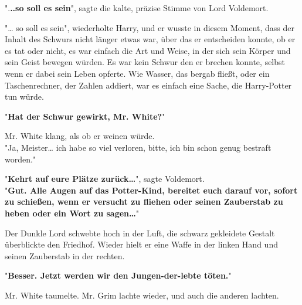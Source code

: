 {".\textbf{..so soll es sein}", sagte die kalte, präzise Stimme von Lord Voldemort.

"… so soll es sein", wiederholte Harry, und er wusste in diesem Moment, dass der Inhalt des Schwurs nicht länger etwas war, über das er entscheiden konnte, ob er es tat oder nicht, es war einfach die Art und Weise, in der sich sein Körper und sein Geist bewegen würden. Es war kein Schwur den er brechen konnte, selbst wenn er dabei sein Leben opferte. Wie Wasser, das bergab fließt, oder ein Taschenrechner, der Zahlen addiert, war es einfach eine Sache, die Harry-Potter tun würde.

"\textbf{Hat der Schwur gewirkt, Mr. White?}"

Mr. White klang, als ob er weinen würde.\\ "Ja, Meister… ich habe so viel verloren, bitte, ich bin schon genug bestraft worden."

"\textbf{Kehrt auf eure Plätze zurück…}", sagte Voldemort.\\ "\textbf{Gut. Alle Augen auf das Potter-Kind, bereitet euch darauf vor, sofort zu schießen, wenn er versucht zu fliehen oder seinen Zauberstab zu heben oder ein Wort zu sagen…}"

Der Dunkle Lord schwebte hoch in der Luft, die schwarz gekleidete Gestalt überblickte den Friedhof. Wieder hielt er eine Waffe in der linken Hand und seinen Zauberstab in der rechten.

"\textbf{Besser. Jetzt werden wir den Jungen-der-lebte töten.}"

Mr. White taumelte. Mr. Grim lachte wieder, und auch die anderen lachten.

}
